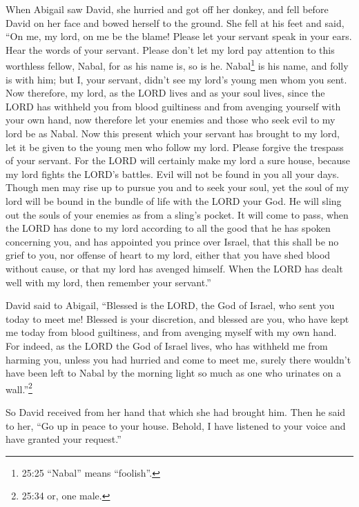 \myverse{}When Abigail saw David, she hurried and got off her donkey,
and fell before David on her face and bowed herself to the ground.
\myverse{}She fell at his feet and said, “On me, my lord, on me be the blame! Please
let your servant speak in your ears. Hear the words of your servant.
\myverse{}Please don’t let my lord pay attention to this worthless fellow, Nabal, for
as his name is, so is he. Nabal\footnote{25:25 “Nabal” means “foolish”.} is his name, and folly is with him; but I, your servant, didn’t
see my lord’s young men whom you sent.
\myverse{}Now therefore, my lord, as the LORD lives and as your soul lives, since the
LORD has withheld you from blood guiltiness and from avenging yourself with your own hand, now therefore
let your enemies and those who seek evil to my lord be as Nabal.
\myverse{}Now this present which your servant has brought to my lord, let it be given
to the young men who follow my lord.
\myverse{}Please forgive the trespass of your servant. For the LORD will certainly
make my lord a sure house, because my lord fights the LORD’s battles. Evil will not be found in you all
your days.
\myverse{}Though men may rise up to pursue you and to seek your soul, yet the soul
of my lord will be bound in the bundle of life with the LORD your God. He will sling out the souls of
your enemies as from a sling’s pocket.
\myverse{}It will come to pass, when the LORD has done to my lord according to all
the good that he has spoken concerning you, and has appointed you prince over Israel,
\myverse{}that this shall be no grief to you, nor offense of heart to my lord, either
that you have shed blood without cause, or that my lord has avenged himself. When the LORD has dealt well
with my lord, then remember your servant.”

\myverse{}David said to Abigail, “Blessed is the LORD, the God of Israel,
who sent you today to meet me!
\myverse{}Blessed is your discretion, and blessed are you, who have kept me today from
blood guiltiness, and from avenging myself with my own hand.
\myverse{}For indeed, as the LORD the God of Israel lives, who has withheld me from
harming you, unless you had hurried and come to meet me, surely there wouldn’t have been left to Nabal
by the morning light so much as one who urinates on a wall.”\footnote{25:34 or, one male.}

\myverse{}So David received from her hand that which she had brought him.
Then he said to her, “Go up in peace to your house. Behold, I have listened to your voice and have granted
your request.”

